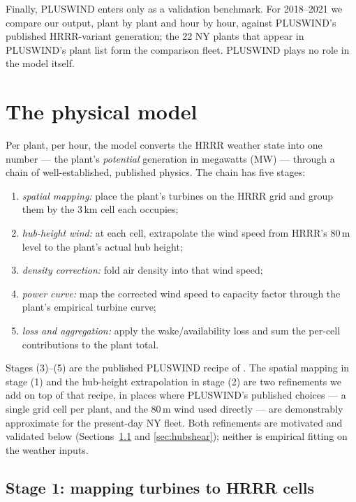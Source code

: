 \documentclass[11pt]{article}
\begin{document}
Finally, PLUSWIND enters only as a validation benchmark. For 2018--2021
we compare our output, plant by plant and hour by hour, against
PLUSWIND's published HRRR-variant generation; the 22 NY plants that
appear in PLUSWIND's plant list form the comparison fleet. PLUSWIND
plays no role in the model itself.

\section{The physical model}
\label{sec:model}

Per plant, per hour, the model converts the HRRR weather state into one
number --- the plant's \emph{potential} generation in megawatts (MW) ---
through a chain of well-established, published physics. The chain has
five stages:
\begin{enumerate}[leftmargin=*, label=(\arabic*)]
  \item \emph{spatial mapping:} place the plant's turbines on the HRRR
        grid and group them by the 3\,km cell each occupies;
  \item \emph{hub-height wind:} at each cell, extrapolate the wind speed
        from HRRR's 80\,m level to the plant's actual hub height;
  \item \emph{density correction:} fold air density into that wind speed;
  \item \emph{power curve:} map the corrected wind speed to capacity
        factor through the plant's empirical turbine curve;
  \item \emph{loss and aggregation:} apply the wake/availability loss and
        sum the per-cell contributions to the plant total.
\end{enumerate}
Stages (3)--(5) are the published PLUSWIND recipe of
\citet{millstein2023pluswind}. The spatial mapping in stage (1) and the
hub-height extrapolation in stage (2) are two refinements we add on top
of that recipe, in places where PLUSWIND's published choices --- a single
grid cell per plant, and the 80\,m wind used directly --- are demonstrably
approximate for the present-day NY fleet. Both refinements are motivated
and validated below (Sections~\ref{sec:multicell_why} and
\ref{sec:hubshear}); neither is empirical fitting on the weather inputs.

\subsection{Stage 1: mapping turbines to HRRR cells}
\label{sec:multicell_why}
\end{document}

